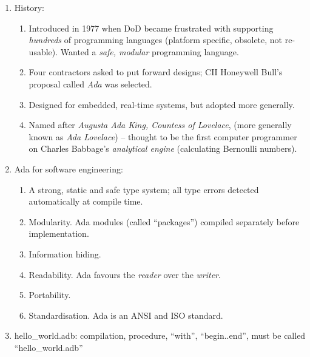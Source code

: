 \documentclass[11pt]{article}
\begin{document}
\begin{enumerate}

 \item History:

  \begin{enumerate}

   \item Introduced in 1977 when DoD became frustrated with supporting \emph{hundreds} of programming languages (platform specific, obsolete, not re-usable). Wanted a \emph{safe, modular} programming language.

   \item Four contractors asked to put forward designs;  CII Honeywell Bull's proposal called \emph{Ada} was selected. 

   \item Designed for embedded, real-time systems, but adopted more generally.

   \item Named after \emph{Augusta Ada King, Countess of Lovelace}, (more generally known as \emph{Ada Lovelace}) -- thought to be the first computer programmer on Charles Babbage's \emph{analytical engine} (calculating Bernoulli numbers).

  \end{enumerate}

\item Ada for software engineering:

   \begin{enumerate}

   \item  A strong, static and safe type system; all type errors detected automatically at compile time.

  \item Modularity. Ada modules (called ``packages'') compiled separately before implementation.

  \item Information hiding. 

  \item Readability. Ada favours the \emph{reader} over the \emph{writer}.

  \item Portability. 
  
  \item Standardisation. Ada is an ANSI and ISO standard.

   \end{enumerate}

 \item hello\_world.adb:  compilation, procedure, ``with'', ``begin..end'', must be called ``hello\_world.adb''


\end{enumerate}
\end{document}

